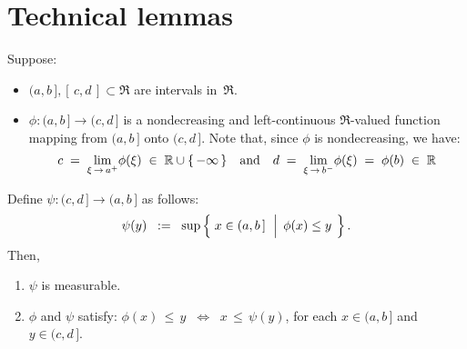 

\section{Technical lemmas}
\setcounter{theorem}{0}
\setcounter{equation}{0}


\renewcommand{\theenumi}{\roman{enumi}}
\renewcommand{\labelenumi}{\textnormal{(\theenumi)}$\;\;$}


\begin{lemma}
\mbox{}\vskip 0.1cm
\noindent
Suppose:
\begin{itemize}
\item
	$(a,b\,], [\,c,d\,] \subset \Re$ are intervals in \,$\Re$.
\item
	$\phi : (a,b\,] \longrightarrow (c,d\,]$ is a nondecreasing and left-continuous
	$\Re$-valued function mapping from $(a,b\,]$ {\color{red}onto} $(c,d\,]$.
	Note that, since $\phi$ is nondecreasing, we have:
	\begin{equation*}
	c \; = \; \underset{\xi\,\rightarrow\,a^{+}}{\lim}\phi(\xi) \; \in \; \Re\cup\{\,-\infty\,\}
	\quad\textnormal{and}\quad
	d \; = \; \underset{\xi\,\rightarrow\,b^{-}}{\lim}\phi(\xi) \; = \; \phi(b) \; \in \; \Re
	\end{equation*}
\end{itemize}
Define \;$\psi : (c,d\,] \longrightarrow (a,b\,]$\; as follows:
\begin{equation*}
\psi(y)
\;\; := \;\;
	\sup\left\{\;
		x \in (a,b\,]
	\,\;\left\vert\;\,
		\overset{{\color{white}.}}{\phi}(x) \leq y
	\right.
	\;\right\}.
\end{equation*}
Then,
\begin{enumerate}
\item
	$\psi$ is measurable.
\item
	$\phi$ and $\psi$ satisfy:\quad
	$\phi(x) \,\leq\, y \;\; \Longleftrightarrow \;\; x \,\leq\, \psi(y)$,\;\;
	for each \;$x \in (a,b\,]$\; and \;$y \in (c,d\,]$.
\end{enumerate}
\end{lemma}
\proof
